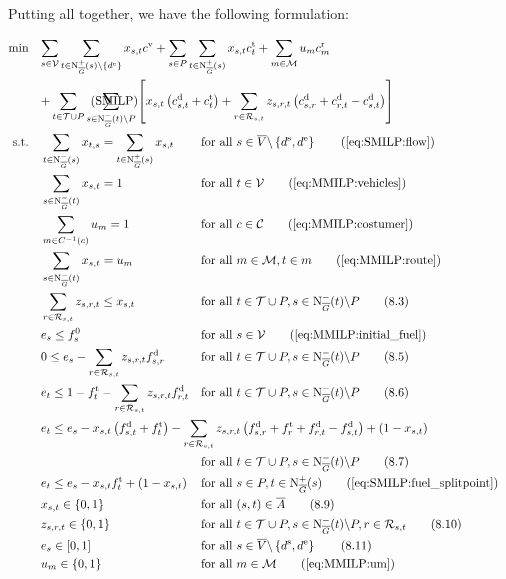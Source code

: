 Putting all together, we have the following formulation:

\begin{align}
	\min \quad & \omit\rlap{$\displaystyle{\sum_{s\in\mathcal{V}} \sum_{t\in\Nouto(s)\backslash\{d^{\operatorname{e}}\}} x_{s,t}\cv + \sum_{s\in P}\sum_{t\in\Nouto(s)} x_{s,t} \ct_t + \sum_{m\in\mathcal{M}} u_m \croute_m}$} \nonumber \\
	& \omit\rlap{$\displaystyle{ + \sum_{t\in\mathcal{T}\cup P} \sum_{s\in\Nino(t)\backslash P} \left[x_{s,t}\left(\cd_{s,t}+\ct_t\right) + \sum_{r\in\Rst} z_{s,r,t}\left(\cd_{s,r}+\cd_{r,t}-\cd_{s,t}\right)\right]}$} \tag{SMILP} \label{eq:SMILP} \\
	\text{s.t.} \quad & \sum_{t\in\Nino(s)} x_{t,s} = \sum_{t\in\Nouto(s)} x_{s,t} & & \text{for all } s\in \overline{V}\backslash\left\{d^{\operatorname{s}},d^{\operatorname{e}}\right\} \tag{\ref{eq:SMILP:flow}} \\
	& \sum_{s\in\Nino(t)} x_{s,t} = 1 & & \text{for all } t\in\mathcal{V} \tag{\ref{eq:MMILP:vehicles}} \\
	& \sum_{m\in C^{-1}(c)} u_m = 1 && \text{for all } c\in\mathcal{C} \tag{\ref{eq:MMILP:costumer}} \\
	& \sum_{s\in\Nino(t)} x_{s,t} = u_m && \text{for all } m\in\mathcal{M},t\in m \tag{\ref{eq:MMILP:route}} \\
	& \sum_{r\in\Rst} z_{s,r,t} \leq x_{s,t} & & \text{for all } t\in\mathcal{T}\cup P, s\in\Nino(t)\backslash P \tag{8.3} \label{eq:SMILP:refuel} \\
	& e_s \leq f_s^0 & & \text{for all } s\in\mathcal{V} \tag{\ref{eq:MMILP:initial_fuel}} \\
	& 0 \leq e_s - \sum_{r\in\Rst} z_{s,r,t}\fd_{s,r} & & \text{for all } t\in\mathcal{T}\cup P, s\in\Nino(t)\backslash P \tag{8.5} \label{eq:SMILP:min_fuel} \\
	& e_t \leq 1 - \ft_t - \sum_{r\in\Rst} z_{s,r,t}\fd_{r,t} & & \text{for all } t\in\mathcal{T}\cup P, s\in\Nino(t)\backslash P \tag{8.6} \label{eq:SMILP:max_fuel} \\
	& \omit\rlap{$\displaystyle{e_t \leq e_s - x_{s,t}\left(f_{s,t}^{\operatorname{d}}+f_t^{\operatorname{t}}\right) - \sum_{r\in\Rst} z_{s,r,t}\left(\fd_{s,r}+\ft_r+\fd_{r,t}-\fd_{s,t}\right) + \left(1-x_{s,t}\right)}$} \nonumber \\
	& & & \text{for all } t\in\mathcal{T}\cup P, s\in\Nino(t)\backslash P \tag{8.7} \label{eq:SMILP:fuel_consumption} \\
	& e_t \leq e_s-x_{s,t}\ft_t+\left(1-x_{s,t}\right) && \text{for all } s\in P,t\in\Nouto(s) \tag{\ref{eq:SMILP:fuel_splitpoint}} \\
	& x_{s,t}\in\{0,1\} & & \text{for all } (s,t)\in\overline{A} \tag{8.9}\\
	& z_{s,r,t}\in\{0,1\} & & \text{for all } t\in\mathcal{T}\cup P,s\in\Nino(t)\backslash P,r\in\Rst \tag{8.10} \\
	& e_s\in[0,1] & & \text{for all } s\in\overline{V}\backslash\left\{d^{\operatorname{s}},d^{\operatorname{e}}\right\} \tag{8.11} \\
	& u_m \in\{0,1\} && \text{for all } m\in\mathcal{M} \tag{\ref{eq:MMILP:um}}
\end{align}


